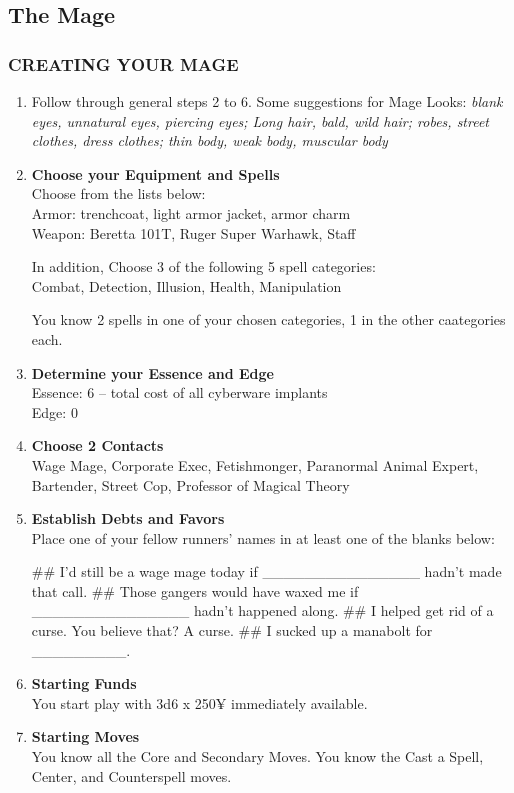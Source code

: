 \clearpage
\subsection{The Mage}

\subsubsection{CREATING YOUR MAGE}
\begin{enumerate}
    \item Follow through general steps 2 to 6. Some suggestions for Mage Looks: \textit{blank eyes, unnatural eyes, piercing eyes; Long hair, bald, wild hair; robes, street clothes, dress clothes; thin body, weak body, muscular body}
    
    \item \textbf{Choose your Equipment and Spells} \\
    Choose from the lists below: \\
    Armor: trenchcoat, light armor jacket, armor charm \\
    Weapon: Beretta 101T, Ruger Super Warhawk, Staff
    
    In addition, Choose 3 of the following 5 spell categories: \\
    Combat, Detection, Illusion, Health, Manipulation
    
    You know 2 spells in one of your chosen categories, 1 in the other caategories each.
    
    \item \textbf{Determine your Essence and Edge} \\
    Essence: 6 – total cost of all cyberware implants \\
    Edge: 0
    
    \item \textbf{Choose 2 Contacts} \\
    Wage Mage, Corporate Exec, Fetishmonger, Paranormal Animal Expert, Bartender, Street Cop, Professor of Magical Theory
    
    \item \textbf{Establish Debts and Favors} \\
    Place one of your fellow runners’ names in at least one of the blanks below:
        \begin{easylist}
            ## I’d still be a wage mage today if \_\_\_\_\_\_\_\_\_\_\_\_\_\_\_ hadn’t made that call.
            ## Those gangers would have waxed me if \_\_\_\_\_\_\_\_\_\_\_\_\_\_\_ hadn’t happened along.
            ## I helped get rid of a curse. You believe that? A curse.
            ## I sucked up a manabolt for \_\_\_\_\_\_\_\_\_.
        \end{easylist}
    
    \item \textbf{Starting Funds} \\
    You start play with 3d6 x 250¥ immediately available.
    
    \item \textbf{Starting Moves} \\
    You know all the Core and Secondary Moves. You know the Cast a Spell, Center, and Counterspell moves.
\end{enumerate}

